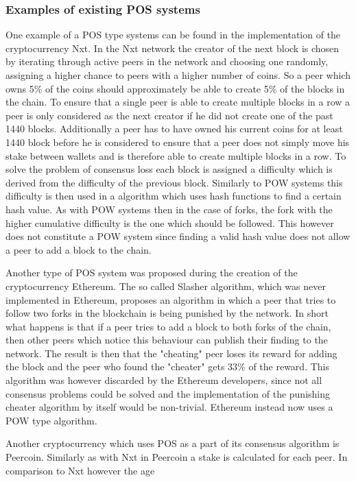 \subsubsection{Examples of existing POS systems}

One example of a POS type systems can be found in the implementation of the cryptocurrency Nxt. In the Nxt network the creator of the next block is chosen by iterating through active peers in the
network and choosing one randomly, assigning a higher chance to peers with a higher number of coins. So a peer which owns 5\% of the coins should approximately be able to create 5\% of the blocks
in the chain. To ensure that a single peer is able to create multiple blocks in a row a peer is only considered as the next creator if he did not create one of the past 1440 blocks. Additionally
a peer has to have owned his current coins for at least 1440 block before he is considered to ensure that a peer does not simply move his stake between wallets and is therefore able to create
multiple blocks in a row. To solve the problem of consensus loss each block is assigned a difficulty which is derived from the difficulty of the previous block. Similarly to POW systems this
difficulty is then used in a algorithm which uses hash functions to find a certain hash value. As with POW systems then in the case of forks, the fork with the higher cumulative difficulty is
the one which should be followed. This however does not constitute a POW system since finding a valid hash value does not allow a peer to add a block to the chain.\cite{url:nxt}\par
Another type of POS system was proposed during the creation of the cryptocurrency Ethereum. The so called Slasher algorithm, which was never implemented in Ethereum, proposes an algorithm in
which a peer that tries to follow two forks in the blockchain is being punished by the network. In short what happens is that if a peer tries to add a block to both forks of the chain, then
other peers which notice this behaviour can publish their finding to the network. The result is then that the "cheating" peer loses its reward for adding the block and the peer who found the
"cheater" gets 33\% of the reward.\cite{url:eth_slash} This algorithm was however discarded by the Ethereum developers, since not all consensus problems could be solved and the implementation of the punishing cheater
algorithm by itself would be non-trivial.\cite{url:eth_no_slash} Ethereum instead now uses a POW type algorithm.\cite{url:eth_pow}\par
Another cryptocurrency which uses POS as a part of its consensus algorithm is Peercoin. Similarly as with Nxt in Peercoin a stake is calculated for each peer. In comparison to Nxt however the age
